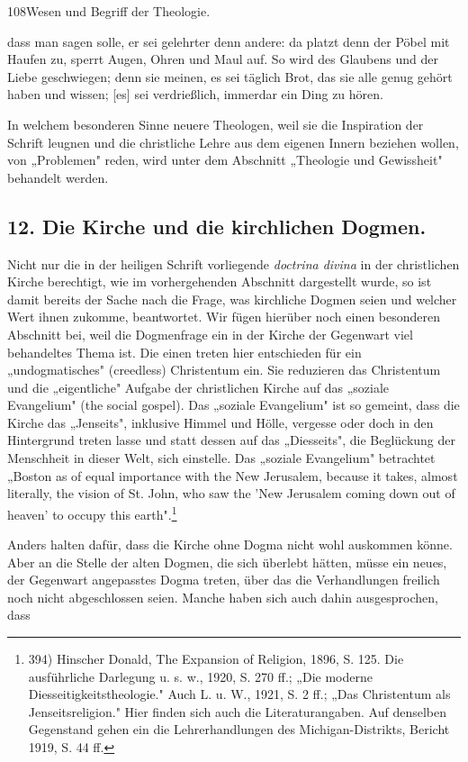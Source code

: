 108\hfill Wesen und Begriff der Theologie.\par
dass man sagen solle, er sei gelehrter denn andere: da platzt denn der Pöbel mit Haufen zu, sperrt Augen, Ohren und Maul auf. So wird des Glaubens und der Liebe geschwiegen; denn sie meinen, es sei täglich Brot, das sie alle genug gehört haben und wissen; [es] sei verdrießlich, immerdar ein Ding zu hören.\par
In welchem besonderen Sinne neuere Theologen, weil sie die Inspiration der Schrift leugnen und die christliche Lehre aus dem eigenen Innern beziehen wollen, von „Problemen" reden, wird unter dem Abschnitt „Theologie und Gewissheit" behandelt werden.\par
\subsection*{12. Die Kirche und die kirchlichen Dogmen.}\par
Nicht nur die in der heiligen Schrift vorliegende \emph{doctrina divina} in der christlichen Kirche berechtigt, wie im vorhergehenden Abschnitt dargestellt wurde, so ist damit bereits der Sache nach die Frage, was kirchliche Dogmen seien und welcher Wert ihnen zukomme, beantwortet. Wir fügen hierüber noch einen besonderen Abschnitt bei, weil die Dogmenfrage ein in der Kirche der Gegenwart viel behandeltes Thema ist. Die einen treten hier entschieden für ein „undogmatisches" (creedless) Christentum ein. Sie reduzieren das Christentum und die „eigentliche" Aufgabe der christlichen Kirche auf das „soziale Evangelium" (the social gospel). Das „soziale Evangelium" ist so gemeint, dass die Kirche das „Jenseits", inklusive Himmel und Hölle, vergesse oder doch in den Hintergrund treten lasse und statt dessen auf das „Diesseits", die Beglückung der Menschheit in dieser Welt, sich einstelle. Das „soziale Evangelium" betrachtet „Boston as of equal importance with the New Jerusalem, because it takes, almost literally, the vision of St. John, who saw the 'New Jerusalem coming down out of heaven' to occupy this earth".\footnote{394) Hinscher Donald, The Expansion of Religion, 1896, S. 125. Die ausführliche Darlegung u. s. w., 1920, S. 270 ff.; „Die moderne Diesseitigkeitstheologie." Auch L. u. W., 1921, S. 2 ff.; „Das Christentum als Jenseitsreligion." Hier finden sich auch die Literaturangaben. Auf denselben Gegenstand gehen ein die Lehrerhandlungen des Michigan-Distrikts, Bericht 1919, S. 44 ff.}\par
Anders halten dafür, dass die Kirche ohne Dogma nicht wohl auskommen könne. Aber an die Stelle der alten Dogmen, die sich überlebt hätten, müsse ein neues, der Gegenwart angepasstes Dogma treten, über das die Verhandlungen freilich noch nicht abgeschlossen seien. Manche haben sich auch dahin ausgesprochen, dass